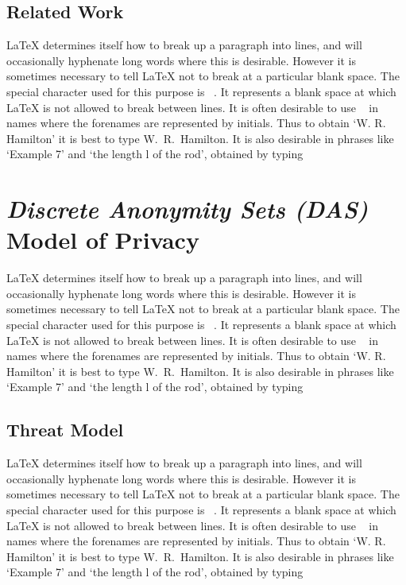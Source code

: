 \documentclass[12pt]{report}
\begin{document}
\section{Related Work}

LaTeX determines itself how to break up a paragraph into lines, and will occasionally hyphenate long words where this is desirable. However it is sometimes necessary to tell LaTeX not to break at a particular blank space. The special character used for this purpose is ~. It represents a blank space at which LaTeX is not allowed to break between lines. It is often desirable to use ~ in names where the forenames are represented by initials. Thus to obtain `W. R. Hamilton' it is best to type W.~R.~Hamilton. It is also desirable in phrases like `Example 7' and `the length l of the rod', obtained by typing



\chapter{{\it Discrete Anonymity Sets (DAS)} Model of Privacy}

LaTeX determines itself how to break up a paragraph into lines, and will occasionally hyphenate long words where this is desirable. However it is sometimes necessary to tell LaTeX not to break at a particular blank space. The special character used for this purpose is ~. It represents a blank space at which LaTeX is not allowed to break between lines. It is often desirable to use ~ in names where the forenames are represented by initials. Thus to obtain `W. R. Hamilton' it is best to type W.~R.~Hamilton. It is also desirable in phrases like `Example 7' and `the length l of the rod', obtained by typing



\section{Threat Model}

LaTeX determines itself how to break up a paragraph into lines, and will occasionally hyphenate long words where this is desirable. However it is sometimes necessary to tell LaTeX not to break at a particular blank space. The special character used for this purpose is ~. It represents a blank space at which LaTeX is not allowed to break between lines. It is often desirable to use ~ in names where the forenames are represented by initials. Thus to obtain `W. R. Hamilton' it is best to type W.~R.~Hamilton. It is also desirable in phrases like `Example 7' and `the length l of the rod', obtained by typing
\end{document}
